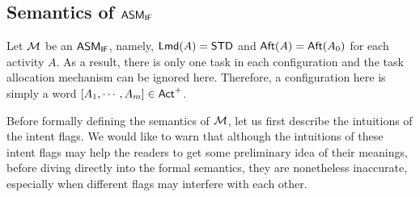 
\subsection{Semantics of $\textsf{ASM}_\textsf{IF}$}



Let ${\mathcal{M} }$ be an $\textsf{ASM}_\textsf{IF}$, namely, ${\sf Lmd}(A) = \mathsf{STD}$ and ${\sf Aft}(A) = {\sf Aft}(A_0)$ for each activity $A$. As a result, there is only one task in each configuration and the task allocation mechanism can be ignored here. Therefore, a configuration here is simply a word $[A_1,\cdots,A_m]\in{\sf Act}^+$. 

Before formally defining the semantics of ${\mathcal{M} }$, let us first describe the intuitions of the intent flags. 
We would like to warn that although the intuitions of these intent flags may help the readers to get some preliminary idea of their meanings, before diving directly into the formal semantics, they are nonetheless inaccurate, especially when different flags may interfere with each other.

